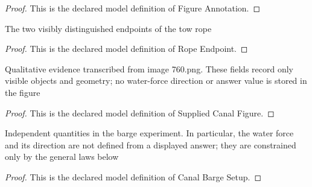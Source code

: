 \begin{proof}
  This is the declared model definition of Figure Annotation.
\end{proof}
\begin{definition}
  \label{def:physics:phyx-mini-0760:phyxminiproblems-problemphyxmini0760-ropeendpoint}
  The two visibly distinguished endpoints of the tow rope
\end{definition}
\begin{proof}
  This is the declared model definition of Rope Endpoint.
\end{proof}
\begin{definition}
  \label{def:physics:phyx-mini-0760:phyxminiproblems-problemphyxmini0760-suppliedcanalfigure}
  Qualitative evidence transcribed from image 760.png. These fields record only visible objects and geometry; no water-force direction or answer value is stored in the figure
\end{definition}
\begin{proof}
  This is the declared model definition of Supplied Canal Figure.
\end{proof}
\begin{definition}
  \label{def:physics:phyx-mini-0760:phyxminiproblems-problemphyxmini0760-canalbargesetup}
  Independent quantities in the barge experiment. In particular, the water force and its direction are not defined from a displayed answer; they are constrained only by the general laws below
\end{definition}
\begin{proof}
  This is the declared model definition of Canal Barge Setup.
\end{proof}
